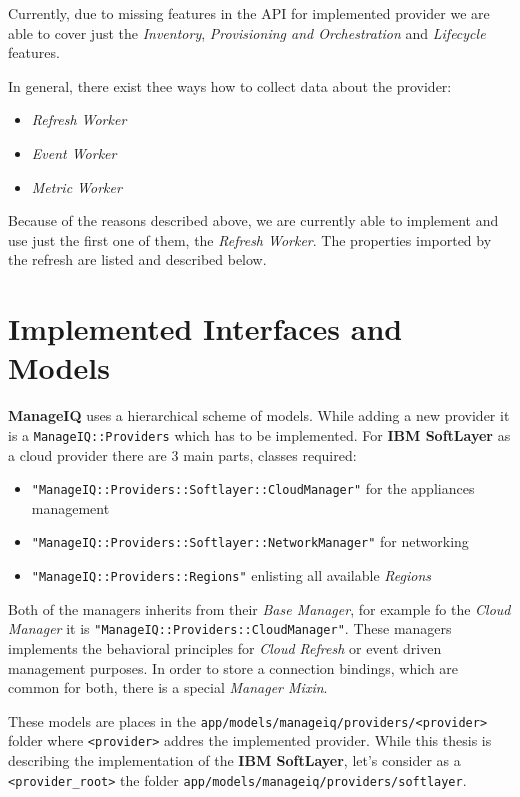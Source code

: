 Currently, due to missing features in the API for implemented provider we are able to cover just the \emph{Inventory}, \emph{Provisioning and Orchestration} and \emph{Lifecycle} features.

In general, there exist thee ways how to collect data about the provider:

\begin{itemize}
	\item \emph{Refresh Worker}
	\item \emph{Event Worker}
	\item \emph{Metric Worker}
\end{itemize}

Because of the reasons described above, we are currently able to implement and use just the first one of them, the \emph{Refresh Worker}. The properties imported by the refresh are listed and described below.

\section{Implemented Interfaces and Models}
\label{sec:Implemented Interfaces and Models}

\textbf{ManageIQ} uses a hierarchical scheme of models. While adding a new provider it is a \verb|ManageIQ::Providers| which has to be implemented. For \textbf{IBM SoftLayer} as a cloud provider there are 3 main parts, classes required:

\begin{itemize}
	\item \verb|"ManageIQ::Providers::Softlayer::CloudManager"| for the appliances management
	\item \verb|"ManageIQ::Providers::Softlayer::NetworkManager"| for networking
	\item \verb|"ManageIQ::Providers::Regions"| enlisting all available \emph{Regions}
\end{itemize}

Both of the managers inherits from their \emph{Base Manager}, for example fo the \emph{Cloud Manager} it is \verb|"ManageIQ::Providers::CloudManager"|. These managers implements the behavioral principles for \emph{Cloud Refresh} or event driven management purposes. In order to store a connection bindings, which are common for both, there is a special \emph{Manager Mixin}.

These models are places in the \verb|app/models/manageiq/providers/<provider>| folder where \verb|<provider>| addres the implemented provider. While this thesis is describing the implementation of the \textbf{IBM SoftLayer}, let's consider as a \verb|<provider_root>| the folder \verb|app/models/manageiq/providers/softlayer|.

